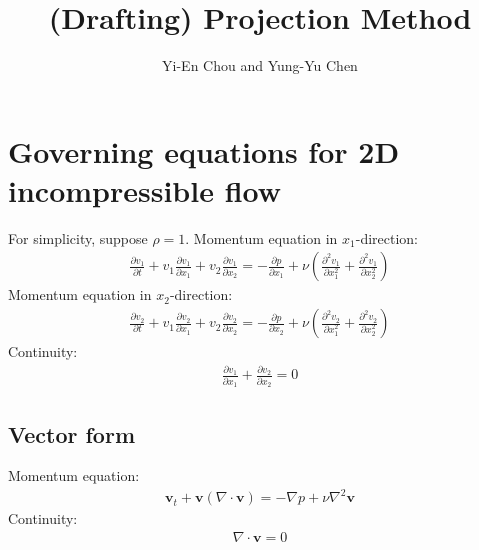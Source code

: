 \documentclass[11pt,dvips]{article}
\title{
%
(Drafting) Projection Method
%
}
\author{
%
Yi-En Chou and Yung-Yu Chen
%
}
\numberwithin{equation}{section}
\begin{document}
\maketitle

\begin{abstract}
%
%
\end{abstract}


\section{Governing equations for 2D incompressible flow}\label{s:projection}

For simplicity, suppose $\rho=1$.
Momentum equation in $x_1$-direction:
%
\begin{align}
\frac{\partial v_1}{\partial t}+v_1 \frac{\partial v_1}{\partial x_1}+v_2 \frac{\partial v_1}
{\partial x_2}=-\frac{\partial p}{\partial x_1}+ \nu (\frac{\partial^2 v_1}{\partial x_1^2}
+\frac{\partial^2 v_1}{\partial x_2^2}) \label{e:x_momentum}
\end{align}
%
Momentum equation in $x_2$-direction:
%
\begin{align}
\frac{\partial v_2}{\partial t}+v_1 \frac{\partial v_2}{\partial x_1}+v_2 \frac{\partial v_2}
{\partial x_2}=-\frac{\partial p}{\partial x_2}+ \nu (\frac{\partial^2 v_2}{\partial x_1^2}
+\frac{\partial^2 v_2}{\partial x_2^2}) \label{e:y_momentum}
\end{align}
%
Continuity:  
%
\begin{align}
\frac{\partial v_1}{\partial x_1}+\frac{\partial v_2}{\partial x_2}=0 \label{e:continuity}
\end{align}
%
\subsection{Vector form}
Momentum equation:
%
\begin{align}
\mathbf{v}_t+\mathbf{v}(\nabla \cdot \mathbf{v})=-\nabla p+\nu \nabla^2 \mathbf{v} 
\label{e:momentum_vec}
\end{align}
%
Continuity:
%
\begin{align}
\nabla \cdot \mathbf{v}=0 \label{e:continuity_vec}
\end{align}
%
\end{document}
